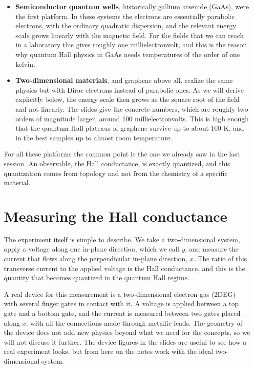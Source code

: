 \begin{itemize}
\item \textbf{Semiconductor quantum wells}, historically gallium arsenide (GaAs), were the first
  platform. In these systems the electrons are essentially parabolic electrons, with the ordinary
  quadratic dispersion, and the relevant energy scale grows linearly with the magnetic field. For
  the fields that we can reach in a laboratory this gives roughly one millielectronvolt, and this is
  the reason why quantum Hall physics in GaAs needs temperatures of the order of one kelvin.
\item \textbf{Two-dimensional materials}, and graphene above all, realize the same physics but
  with Dirac electrons instead of parabolic ones. As we will derive explicitly below, the energy
  scale then grows as the square root of the field and not linearly. The slides give the concrete
  numbers, which are roughly two orders of magnitude larger, around 100 millielectronvolts. This is
  high enough that the quantum Hall plateaus of graphene survive up to about 100 K, and in the best
  samples up to almost room temperature.
\end{itemize}

For all these platforms the common point is the one we already saw in the last session. An
observable, the Hall conductance, is exactly quantized, and this quantization comes from topology
and not from the chemistry of a specific material.

\section{Measuring the Hall conductance}

The experiment itself is simple to describe. We take a two-dimensional system, apply a voltage
along one in-plane direction, which we call $y$, and measure the current that flows along the
perpendicular in-plane direction, $x$. The ratio of this transverse current to the applied voltage
is the Hall conductance, and this is the quantity that becomes quantized in the quantum Hall
regime.

A real device for this measurement is a two-dimensional electron gas (2DEG) with several finger
gates in contact with it. A voltage is applied between a top gate and a bottom gate, and the
current is measured between two gates placed along $x$, with all the connections made through
metallic leads. The geometry of the device does not add new physics beyond what we need for the
concepts, so we will not discuss it further. The device figures in the slides are useful to see
how a real experiment looks, but from here on the notes work with the ideal two-dimensional
system.

